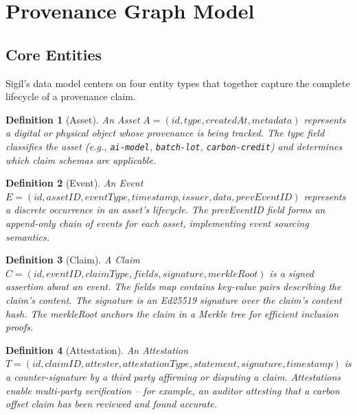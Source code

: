 \documentclass[conference]{IEEEtran}
\newtheorem{definition}{Definition}
\begin{document}

\section{Provenance Graph Model}

\subsection{Core Entities}

Sigil's data model centers on four entity types that together capture the
complete lifecycle of a provenance claim.

\begin{definition}[Asset]
An \emph{Asset} $A = (\mathit{id}, \mathit{type}, \mathit{createdAt},
\mathit{metadata})$ represents a digital or physical object whose provenance
is being tracked.  The \emph{type} field classifies the asset (e.g.,
\texttt{ai-model}, \texttt{batch-lot}, \texttt{carbon-credit}) and determines
which claim schemas are applicable.
\end{definition}

\begin{definition}[Event]
An \emph{Event} $E = (\mathit{id}, \mathit{assetID}, \mathit{eventType},
\mathit{timestamp}, \mathit{issuer}, \mathit{data}, \mathit{prevEventID})$
represents a discrete occurrence in an asset's lifecycle.  The
\emph{prevEventID} field forms an append-only chain of events for each asset,
implementing event sourcing semantics.
\end{definition}

\begin{definition}[Claim]
A \emph{Claim} $C = (\mathit{id}, \mathit{eventID}, \mathit{claimType},
\mathit{fields}, \mathit{signature}, \mathit{merkleRoot})$ is a signed
assertion about an event.  The \emph{fields} map contains key-value pairs
describing the claim's content.  The \emph{signature} is an Ed25519 signature
over the claim's content hash.  The \emph{merkleRoot} anchors the claim in a
Merkle tree for efficient inclusion proofs.
\end{definition}

\begin{definition}[Attestation]
An \emph{Attestation} $T = (\mathit{id}, \mathit{claimID}, \mathit{attester},
\mathit{attestationType}, \mathit{statement}, \mathit{signature},
\mathit{timestamp})$ is a counter-signature by a third party affirming or
disputing a claim.  Attestations enable multi-party verification -- for
example, an auditor attesting that a carbon offset claim has been reviewed and
found accurate.
\end{definition}
\end{document}
